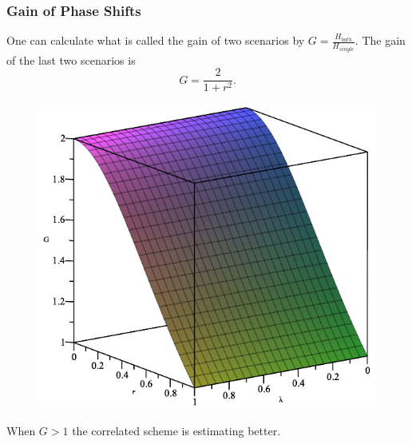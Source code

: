 \documentclass{beamer}
\begin{document}
\begin{frame}
\frametitle{Gain of Phase Shifts}
One can calculate what is called the gain of two scenarios by $G=\frac{H_{both}}{H_{single}}$. The gain of the last two scenarios is 
\begin{equation}\label{eq:34}
G=\frac{2}{1+r^2}.
\end{equation}
\begin{figure}
\begin{center}
\includegraphics[width=0.55\linewidth]{Simple-Scenario-Gain.png}
\end{center}
\end{figure}
When $G>1$ the correlated scheme is estimating better.
\end{frame}
\end{document}
